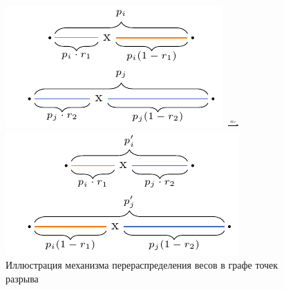 \begin{figure}[!htb]
    \begin{minipage}{0.42\textwidth}
        \centering
        \includegraphics[width=\linewidth]{images/part1/weights-redistribution1.pdf}
    \end{minipage}\hfill
    \begin{minipage}{0.1\textwidth}
        \centering
        \includegraphics[width=\linewidth]{images/part1/arrow.pdf}
        \vspace*{0.2cm}
    \end{minipage}\hfill
    \begin{minipage}{0.42\textwidth}
        \centering
        \includegraphics[width=\linewidth]{images/part1/weights-redistribution2.pdf}
    \end{minipage}
    \caption{Иллюстрация механизма перераспределения весов в графе точек разрыва}
    \label{fig:weights-redistribution}
\end{figure}

